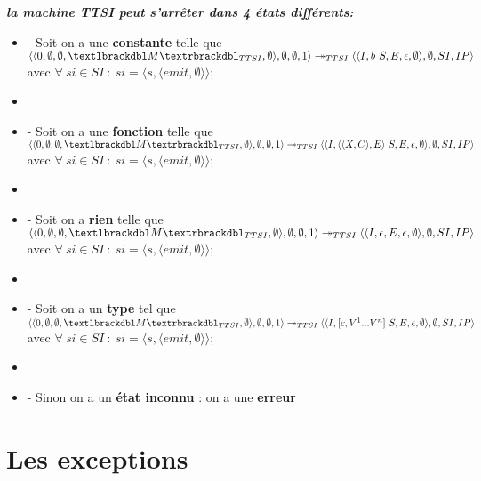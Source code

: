 \documentclass[10pt,a4paper]{report}
\begin{document}
	
	\textbf{\textit{la machine TTSI peut s'arrêter dans 4 états différents:}}
	\smallbreak
	\begin{itemize}
		\item[] - Soit on a une \textbf{constante} telle que 
		$\langle\langle 0,\emptyset,\emptyset,\textlbrackdbl M\textrbrackdbl_{TTSI},\emptyset\rangle,\emptyset,\emptyset,1\rangle 
		\twoheadrightarrow_{TTSI} 
		\langle\langle I,b~S,E,\epsilon,\emptyset\rangle,\emptyset,SI,IP\rangle$
		\\ avec $\forall~si \in SI~:~si = \langle s,\langle emit,\emptyset\rangle\rangle$;
		\item[] 
		\item[] - Soit on a une \textbf{fonction} telle que
		$\langle\langle 0,\emptyset,\emptyset,\textlbrackdbl M\textrbrackdbl_{TTSI},\emptyset\rangle,\emptyset,\emptyset,1\rangle 
		\twoheadrightarrow_{TTSI} 
		\langle\langle I,\langle\langle X,C\rangle,E\rangle~S,E,\epsilon,\emptyset\rangle,\emptyset,SI,IP\rangle$
		\\ avec $\forall~si \in SI~:~si = \langle s,\langle emit,\emptyset\rangle\rangle$;
		\item[] 
		\item[] - Soit on a \textbf{rien} telle que  
		$\langle\langle 0,\emptyset,\emptyset,\textlbrackdbl M\textrbrackdbl_{TTSI},\emptyset\rangle,\emptyset,\emptyset,1\rangle 
		\twoheadrightarrow_{TTSI} 
		\langle\langle I,\epsilon,E,\epsilon,\emptyset\rangle,\emptyset,SI,IP\rangle$
		\\ avec $\forall~si \in SI~:~si = \langle s,\langle emit,\emptyset\rangle\rangle$;
		\item[]
		\item[] - Soit on a un \textbf{type} tel que  
		$\langle\langle 0,\emptyset,\emptyset,\textlbrackdbl M\textrbrackdbl_{TTSI},\emptyset\rangle,\emptyset,\emptyset,1\rangle 
		\twoheadrightarrow_{TTSI} 
		\langle\langle I,[c,V^{1}...V^{n}]~S,E,\epsilon,\emptyset\rangle,\emptyset,SI,IP\rangle$
		\\ avec $\forall~si \in SI~:~si = \langle s,\langle emit,\emptyset\rangle\rangle$;
		\item[]
		\item[] - Sinon on a un \textbf{état inconnu} : on a une \textbf{erreur} 
	\end{itemize}
	\bigbreak
	
	\newpage
	
		\section{Les exceptions}
	
\end{document}
